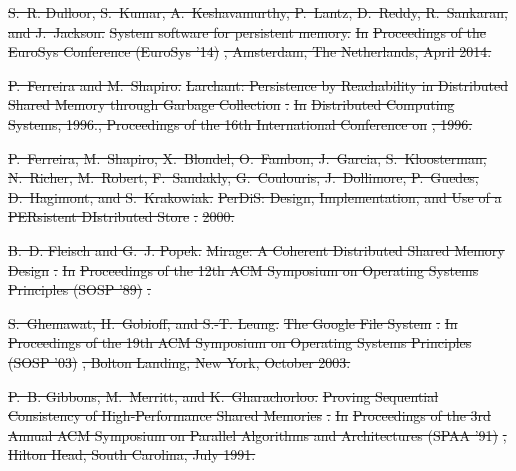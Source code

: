 \documentclass[sigconf]{acmart}
\renewcommand{\em}{\it}
\providecommand{\DIFdel}[1]{{\protect\color{red}\sout{#1}}}                      %
\begin{document}
{%
\DIFdel{S.~R. Dulloor, S.~Kumar, A.~Keshavamurthy, P.~Lantz, D.~Reddy, R.~Sankaran, and
  J.~Jackson.
}%
\DIFdel{System software for persistent memory.
}%
\DIFdel{In }%
\DIFdel{Proceedings of the EuroSys Conference (EuroSys '14)}%
\DIFdel{,
  Amsterdam, The Netherlands, April 2014.
}%

\DIFdel{P.~Ferreira and M.~Shapiro.
}%
\DIFdel{Larchant: Persistence by Reachability in Distributed Shared Memory
  through Garbage Collection}%
\DIFdel{.
}%
\DIFdel{In }%
\DIFdel{Distributed Computing Systems, 1996., Proceedings of the 16th
  International Conference on}%
\DIFdel{, 1996.
}%

\DIFdel{P.~Ferreira, M.~Shapiro, X.~Blondel, O.~Fambon, J.~Garcia, S.~Kloosterman,
  N.~Richer, M.~Robert, F.~Sandakly, G.~Coulouris, J.~Dollimore, P.~Guedes,
  D.~Hagimont, and S.~Krakowiak.
}%
\DIFdel{PerDiS: Design, Implementation, and Use of a PERsistent
  DIstributed Store}%
\DIFdel{.
}%
\DIFdel{2000.
}%

\DIFdel{B.~D. Fleisch and G.~J. Popek.
}%
\DIFdel{Mirage: A Coherent Distributed Shared Memory Design}%
\DIFdel{.
}%
\DIFdel{In }%
\DIFdel{Proceedings of the 12th ACM Symposium on Operating Systems
  Principles (SOSP '89)}%
\DIFdel{.
}%

\DIFdel{S.~Ghemawat, H.~Gobioff, and S.-T. Leung.
}%
\DIFdel{The Google File System}%
\DIFdel{.
}%
\DIFdel{In }%
\DIFdel{Proceedings of the 19th ACM Symposium on Operating Systems
  Principles (SOSP '03)}%
\DIFdel{, Bolton Landing, New York, October 2003.
}%

\DIFdel{P.~B. Gibbons, M.~Merritt, and K.~Gharachorloo.
}%
\DIFdel{Proving Sequential Consistency of High-Performance Shared Memories}%
\DIFdel{.
}%
\DIFdel{In }%
\DIFdel{Proceedings of the 3rd Annual ACM Symposium on Parallel
  Algorithms and Architectures (SPAA ’91)}%
\DIFdel{, Hilton Head, South Carolina, July
  1991.
}%

}
\end{document}
